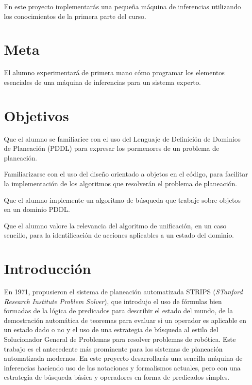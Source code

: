 
En este proyecto implementarás una pequeña máquina de inferencias utilizando los conocimientos de la primera parte del curso.

\section{Meta}

El alumno experimentará de primera mano cómo programar los elementos esenciales de una máquina de inferencias para un sistema experto.

\section{Objetivos}

\begin{compactitem}
 \item Que el alumno se familiarice con el uso del Lenguaje de Definición de Dominios de Planeación (PDDL) para expresar
       los pormenores de un problema de planeación.
 \item Familiarizarse con el uso del diseño orientado a objetos en el código, para facilitar
       la implementación de los algoritmos que resolverán el problema de planeación.
 \item Que el alumno implemente un algoritmo de búsqueda que trabaje sobre objetos en un
       dominio PDDL.
 \item Que el alumno valore la relevancia del algoritmo de unificación, en un caso sencillo,
       para la identificación de acciones aplicables a un estado del dominio.
\end{compactitem}


\begin{auxcode}
 \caption{Máquina de inferencias}
 \centering
\end{auxcode}


\section{Introducción}

En 1971, \cite{Fikes1971} propusieron el sistema de planeación automatizada STRIPS (\textit{STanford Research Institute Problem Solver}), que introdujo el uso de fórmulas bien formadas de la lógica de predicados para describir el estado del mundo, de la demostración automática de teoremas para evaluar si un operador es aplicable en un estado dado o no y el uso de una estrategia de búsqueda al estilo del Solucionador General de Problemas para resolver problemas de robótica.  Este trabajo es el antecedente más prominente para los sistemas de planeación automatizada modernos.  En este proyecto desarrollarás una sencilla máquina de inferencias haciendo uso de las notaciones y formalismos actuales, pero con una estrategia de búsqueda básica y operadores en forma de predicados simples.



